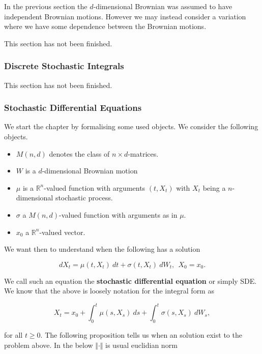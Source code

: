 \documentclass[
]{article}
\providecommand{\tightlist}{%
  \setlength{\itemsep}{0pt}\setlength{\parskip}{0pt}}
\begin{document}
In the previous section the \(d\)-dimensional Brownian was assumed to
have independent Brownian motions. However we may instead consider a
variation where we have some dependence between the Brownian motions.

This section has not been finished.

\hypertarget{discrete-stochastic-integrals}{%
\subsubsection{Discrete Stochastic
Integrals}\label{discrete-stochastic-integrals}}

This section has not been finished.

\hypertarget{stochastic-differential-equations}{%
\subsubsection{Stochastic Differential
Equations}\label{stochastic-differential-equations}}

We start the chapter by formalising some used objects. We consider the
following objects.

\begin{itemize}
\tightlist
\item
  \(M(n,d)\) denotes the class of \(n\times d\)-matrices.
\item
  \(W\) is a \(d\)-dimensional Brownian motion
\item
  \(\mu\) is a \(\mathbb{R}^n\)-valued function with arguments
  \((t,X_t)\) with \(X_t\) being a \(n\)-dimensional stochastic process.
\item
  \(\sigma\) a \(M(n,d)\)-valued function with arguments as in \(\mu\).
\item
  \(x_0\) a \(\mathbb{R}^n\)-valued vector.
\end{itemize}

We want then to understand when the following has a solution

\[
dX_t=\mu(t,X_t)\ dt + \sigma(t,X_t)\ dW_t,\ \ X_0=x_0.\tag{5.1/2}
\]

We call such an equation the \textbf{stochastic differential equation}
or simply SDE. We know that the above is loosely notation for the
integral form as

\[
X_t=x_0+\int_0^t\mu(s,X_s)\ ds +\int_0^t\sigma(s,X_s)\ dW_s,\tag{5.3}
\]

for all \(t\ge 0\). The following proposition tells us when an solution
exist to the problem above. In the below \(\Vert \cdot \Vert\) is usual
euclidian norm
\end{document}
